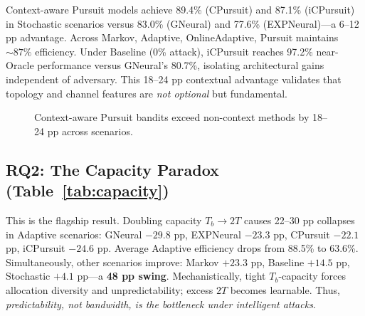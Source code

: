 \documentclass[10pt,twocolumn,journal]{IEEEtran}
\begin{document}
Context-aware Pursuit models achieve 89.4\% (CPursuit) and 87.1\% (iCPursuit) in Stochastic scenarios versus 83.0\% (GNeural) and 77.6\% (EXPNeural)—a 6--12 pp advantage. Across Markov, Adaptive, OnlineAdaptive, Pursuit maintains $\sim 87\%$ efficiency. Under Baseline (0\% attack), iCPursuit reaches 97.2\% near-Oracle performance versus GNeural's 80.7\%, isolating architectural gains independent of adversary. This 18--24 pp contextual advantage validates that topology and channel features are \textit{not optional} but fundamental.

\begin{figure}[tb]
\centering
{}
\caption{Context-aware Pursuit bandits exceed non-context methods by 18--24 pp across scenarios.}
\label{fig:context}
\end{figure}

\subsection{RQ2: The Capacity Paradox (Table~\ref{tab:capacity})}

This is the flagship result. Doubling capacity $T_b \to 2T$ causes 22--30 pp collapses in Adaptive scenarios: GNeural $-29.8$ pp, EXPNeural $-23.3$ pp, CPursuit $-22.1$ pp, iCPursuit $-24.6$ pp. Average Adaptive efficiency drops from 88.5\% to 63.6\%. Simultaneously, other scenarios improve: Markov $+23.3$ pp, Baseline $+14.5$ pp, Stochastic $+4.1$ pp—a \textbf{48 pp swing}. Mechanistically, tight $T_b$-capacity forces allocation diversity and unpredictability; excess $2T$ becomes learnable. Thus, \textit{predictability, not bandwidth, is the bottleneck under intelligent attacks}.
\end{document}
